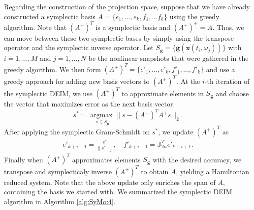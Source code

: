 Regarding the construction of the projection space, suppose that we have already constructed a symplectic basis $A=\{ e_1,\dots , e_k,f_1,\dots f_k \}$ using the greedy algorithm. Note that $(A^+)^T$ is a symplectic basis and $(A^+)^+=A$. Thus, we can move between these two symplectic bases by simply using the transpose operator and the symplectic inverse operator. Let $S_{\mathbf g} = \{ \mathbf g (\mathbf x(t_i,\omega_j)) \}$ with $i = 1,\dots,M$ and $ j = 1 ,\dots,N$ be the nonlinear snapshots that were gathered in the greedy algorithm. We then form $(A^+)^T = \{ e'_1,\dots, e'_k,f'_1,\dots,f'_k\}$ and use a greedy approach for adding new basis vectors to $(A^+)^T$. At the $i$-th iteration of the symplectic DEIM, we use $(A^+)^T$ to approximate elements in $S_{\mathbf g}$ and choose the vector that maximizes error as the next basis vector. 
\begin{equation}
	s^* := \underset{s \in S_{\mathbf g}}{\text{argmax }}\| s - (A^+)^T A^+ s \|_2.	
\end{equation}
After applying the symplectic Gram-Schmidt on $s^*$, we update $(A^+)^T$ as
\begin{equation}
\begin{aligned}
	e'_{k+i+1} = \frac{s^*}{\| s^* \|_2},\quad f'_{k+i+1} = \mathbb J_{2n}^T e'_{k+i+1}.
\end{aligned}
\end{equation}
Finally when $(A^+)^T$ approximates elements $S_{\mathbf g}$ with the desired accuracy, we transpose and symplecticaly inverse $(A^+)^T$ to obtain $A$, yielding a Hamiltonian reduced system. Note that the above update only enriches the span of $A$, containing the basis we started with. We summarized the symplectic DEIM algorithm in Algorithm \ref{alg:SyMo:4}.



